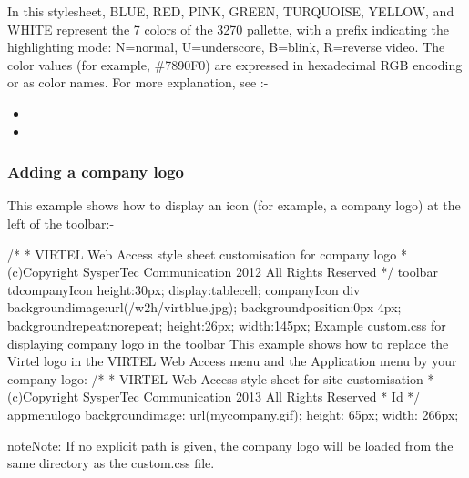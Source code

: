 \documentclass[letterpaper,10pt,english]{sphinxmanual}
\begin{document}

In this stylesheet, BLUE, RED, PINK, GREEN, TURQUOISE, YELLOW, and WHITE represent the 7 colors of the 3270 pallette, with a prefix indicating the highlighting mode: N=normal, U=underscore, B=blink, R=reverse video. The color values (for example, \#7890F0) are expressed in hexadecimal RGB encoding or as color names. For more explanation, see :-
\begin{itemize}
\item {} 

\item {} 

\end{itemize}


\subsubsection{Adding a company logo}
\label{\detokenize{User_Guide:adding-a-company-logo}}
This example shows how to display an icon (for example, a company logo) at the left of the toolbar:-

\begin{sphinxVerbatim}[commandchars=\\\{\}]
/*
* VIRTEL Web Access style sheet customisation for company logo
* (c)Copyright SysperTec Communication 2012 All Rights Reserved
*/
\PYGZsh{}toolbar td\PYGZsh{}companyIcon \PYGZob{}
height:30px;
display:table\PYGZhy{}cell;
\PYGZcb{}
\PYGZsh{}companyIcon div \PYGZob{}
background\PYGZhy{}image:url(\PYGZdq{}/w2h/virtblue.jpg\PYGZdq{});
background\PYGZhy{}position:0px \PYGZhy{}4px;
background\PYGZhy{}repeat:no\PYGZhy{}repeat;
height:26px;
width:145px;
\PYGZcb{}
Example custom.css for displaying company logo in the toolbar
This example shows how to replace the Virtel logo in the VIRTEL Web Access menu and the Application menu by your
company logo:
/*
* VIRTEL Web Access style sheet for site customisation
* (c)Copyright SysperTec Communication 2013 All Rights Reserved
* \PYGZdl{}Id\PYGZdl{}
*/
\PYGZsh{}appmenulogo \PYGZob{}
background\PYGZhy{}image: url(\PYGZdq{}mycompany.gif\PYGZdq{});
height: 65px;
width: 266px;
\PYGZcb{}
\end{sphinxVerbatim}


\begin{sphinxadmonition}{note}{Note:}
If no explicit path is given, the company logo will be loaded from the same directory as the custom.css file.
\end{sphinxadmonition}
\end{document}

